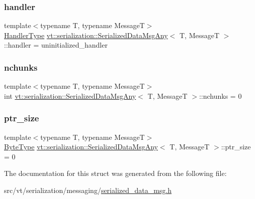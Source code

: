 \subsubsection{\texorpdfstring{handler}{handler}}
{\footnotesize\ttfamily template$<$typename T, typename MessageT$>$ \\
\hyperlink{namespacevt_af64846b57dfcaf104da3ef6967917573}{Handler\+Type} \hyperlink{structvt_1_1serialization_1_1_serialized_data_msg_any}{vt\+::serialization\+::\+Serialized\+Data\+Msg\+Any}$<$ T, MessageT $>$\+::handler = uninitialized\+\_\+handler}

\mbox{\label{structvt_1_1serialization_1_1_serialized_data_msg_any_ae38aba68b339489ae16ad23b7c0cccf2}} 
\subsubsection{\texorpdfstring{nchunks}{nchunks}}
{\footnotesize\ttfamily template$<$typename T, typename MessageT$>$ \\
int \hyperlink{structvt_1_1serialization_1_1_serialized_data_msg_any}{vt\+::serialization\+::\+Serialized\+Data\+Msg\+Any}$<$ T, MessageT $>$\+::nchunks = 0}

\mbox{\label{structvt_1_1serialization_1_1_serialized_data_msg_any_a756d93ea71e8c3f0ec849f49e19cac98}} 
\subsubsection{\texorpdfstring{ptr\+\_\+size}{ptr\_size}}
{\footnotesize\ttfamily template$<$typename T, typename MessageT$>$ \\
\hyperlink{namespacevt_aab8d55968084610ce3b17057981e9300}{Byte\+Type} \hyperlink{structvt_1_1serialization_1_1_serialized_data_msg_any}{vt\+::serialization\+::\+Serialized\+Data\+Msg\+Any}$<$ T, MessageT $>$\+::ptr\+\_\+size = 0}



The documentation for this struct was generated from the following file\+:\begin{DoxyCompactItemize}
\item 
src/vt/serialization/messaging/\hyperlink{serialized__data__msg_8h}{serialized\+\_\+data\+\_\+msg.\+h}\end{DoxyCompactItemize}
